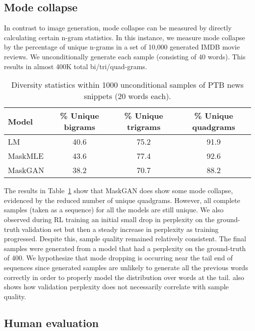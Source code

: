 \subsection{Mode collapse}
In contrast to image generation, mode collapse can be measured by directly calculating certain n-gram statistics. In this instance, we measure mode collapse by the percentage of unique n-grams in a set of 10,000 generated IMDB movie reviews. We unconditionally generate each sample (consisting of 40 words). This results in almost 400K total bi/tri/quad-grams.

\begin{table}[h]
  \centering
  \begin{tabular}{lccc}
    \toprule
    Model & \% Unique bigrams & \% Unique trigrams & \% Unique quadgrams \\
    \midrule
    LM & 40.6 & 75.2 & 91.9 \\
    MaskMLE & 43.6 & 77.4 & 92.6 \\
MaskGAN & 38.2 & 70.7 & 88.2 \\
\bottomrule
  \end{tabular}

  \caption{Diversity statistics within 1000 unconditional samples of PTB news snippets (20 words each).  \label{table:diversity}}
\end{table}

The results in Table~\ref{table:diversity} show that MaskGAN does show some mode collapse, evidenced by the reduced number of unique quadgrams. However, all complete samples (taken as a sequence) for all the models are still unique. We also observed during RL training an initial small drop in perplexity on the ground-truth validation set but then a steady increase in perplexity as training progressed. Despite this, sample quality remained relatively consistent. The final samples were generated from a model that had a perplexity on the ground-truth of 400. We hypothesize that mode dropping is occurring near the tail end of sequences since generated samples are unlikely to generate all the previous words correctly in order to properly model the distribution over words at the tail. \cite{theis2015note} also shows how validation perplexity does not necessarily correlate with sample quality. 



\subsection{Human evaluation}

